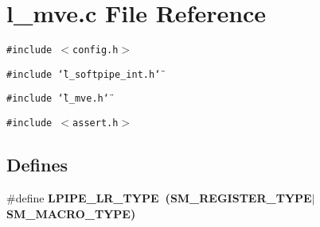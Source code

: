 \section{l\_\-mve.c File Reference}
\label{l__mve_8c}
{\tt \#include $<$config.h$>$}\par
{\tt \#include \char`\"{}l\_\-softpipe\_\-int.h\char`\"{}}\par
{\tt \#include \char`\"{}l\_\-mve.h\char`\"{}}\par
{\tt \#include $<$assert.h$>$}\par
\subsection*{Defines}
\begin{CompactItemize}
\item 
\#define \bf{LPIPE\_\-LR\_\-TYPE}~(\bf{SM\_\-REGISTER\_\-TYPE}$|$\bf{SM\_\-MACRO\_\-TYPE})
\end{CompactItemize}
